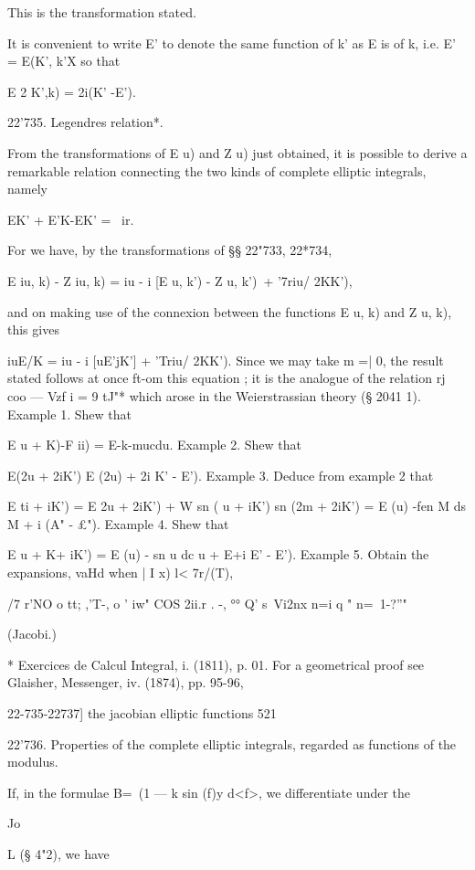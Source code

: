 This is the transformation stated.

It is convenient to write E' to denote the same function of k' as E is
of k, i.e. E' = E(K', k'X so that

E 2 K',k) = 2i(K' -E').

22'735. Legendres relation*.

From the transformations of E u) and Z u) just obtained, it is
possible to derive a remarkable relation connecting the two kinds of
complete elliptic integrals, namely

EK' + E'K-EK' = \ ir.

For we have, by the transformations of §§ 22"733, 22*734,

E iu, k) - Z iu, k) = iu - i [E u, k') - Z u, k')\ + '7riu/ 2KK'),

and on making use of the connexion between the functions E u, k) and Z
u, k), this gives

iuE/K = iu - i [uE'jK'] + 'Triu/ 2KK'). Since we may take m =| 0, the
result stated follows at once ft-om this equation ; it is the analogue
of the relation rj coo — Vzf i = 9 tJ"* which arose in the
Weierstrassian theory (§ 2041 1). Example 1. Shew that

E u + K)-F ii) = E-k-mucdu. Example 2. Shew that

E(2u + 2iK') E (2u) + 2i K' - E'). Example 3. Deduce from example 2
that

E ti + iK') = E 2u + 2iK') + W sn ( u + iK') sn (2m + 2iK') = E (u)
-fen M ds M + i (A" - £"). Example 4. Shew that

E u + K+ iK') = E (u) - sn u dc u + E+i E' - E'). Example 5. Obtain
the expansions, vaHd when | I x) l< 7r/(T),

/7 r'NO o tt; ,'T-, o ' iw" COS 2ii.r . -, °° Q' s\ Vi2nx n=i q " n=\
1-?''"

(Jacobi.)

* Exercices de Calcul Integral, i. (1811), p. 01. For a geometrical
proof see Glaisher, Messenger, iv. (1874), pp. 95-96,



22-735-22737] the jacobian elliptic functions 521

22'736. Properties of the complete elliptic integrals, regarded as
functions of the modulus.



If, in the formulae B=\ (1 — k sin (f)y d<f>, we differentiate under
the

Jo

L (§ 4"2), we have

